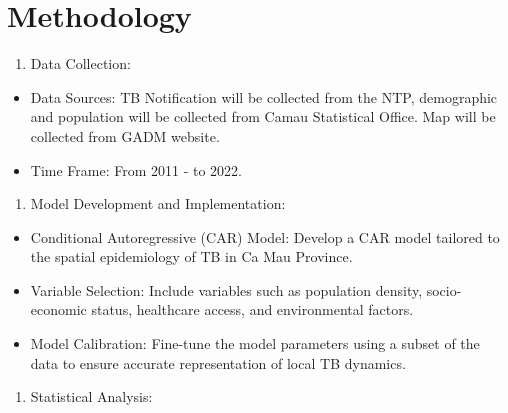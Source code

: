 \documentclass[
  number,
  preprint,
  3p]{elsarticle}
\providecommand{\tightlist}{%
  \setlength{\itemsep}{0pt}\setlength{\parskip}{0pt}}\usepackage{longtable,booktabs,array}
\begin{document}
\hypertarget{methodology}{%
\section{Methodology}\label{methodology}}

\begin{enumerate}
\def\labelenumi{\arabic{enumi}.}
\tightlist
\item
  Data Collection:\\
\end{enumerate}

\begin{itemize}
\tightlist
\item
  Data Sources: TB Notification will be collected from the NTP,
  demographic and population will be collected from Camau Statistical
  Office. Map will be collected from GADM website.\\
\item
  Time Frame: From 2011 - to 2022.\\
\end{itemize}

\begin{enumerate}
\def\labelenumi{\arabic{enumi}.}
\setcounter{enumi}{1}
\tightlist
\item
  Model Development and Implementation:\\
\end{enumerate}

\begin{itemize}
\tightlist
\item
  Conditional Autoregressive (CAR) Model: Develop a CAR model tailored
  to the spatial epidemiology of TB in Ca Mau Province.\\
\item
  Variable Selection: Include variables such as population density,
  socio-economic status, healthcare access, and environmental factors.\\
\item
  Model Calibration: Fine-tune the model parameters using a subset of
  the data to ensure accurate representation of local TB dynamics.\\
\end{itemize}

\begin{enumerate}
\def\labelenumi{\arabic{enumi}.}
\setcounter{enumi}{2}
\tightlist
\item
  Statistical Analysis:\\
\end{enumerate}
\end{document}
